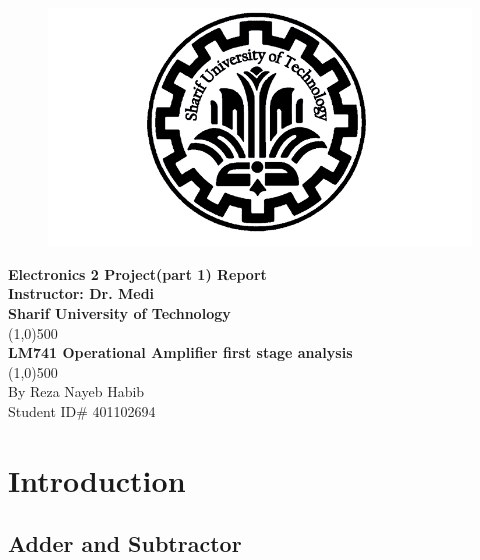 \documentclass[11pt]{article}
\begin{document}
    
\begin{titlepage}
\begin{center}

\begin{figure}[H]
\begin{center}
\includegraphics[scale=0.4]{Fig/SUT.png}

\end{center}
\end{figure}

\huge{\textbf{Electronics 2 Project(part 1) Report}} \\ 
\vspace*{2cm}
\Large{\textbf{Instructor: Dr. Medi}} \\
\vspace*{1cm}
\huge{\textbf{Sharif University of Technology}} \\
\line(1,0){500} \\ 
\Huge{\textbf{LM741 Operational Amplifier first stage analysis}} \\
\line(1,0){500} \\
\vfill
\Large{By Reza Nayeb Habib}\\
\Large{Student ID\# 401102694} \\

\end{center}
\end{titlepage}

\tableofcontents
\thispagestyle{empty}
\clearpage
\setcounter{page}{1}

\section{Introduction}
\subsection{Adder and Subtractor} 
\end{document}
